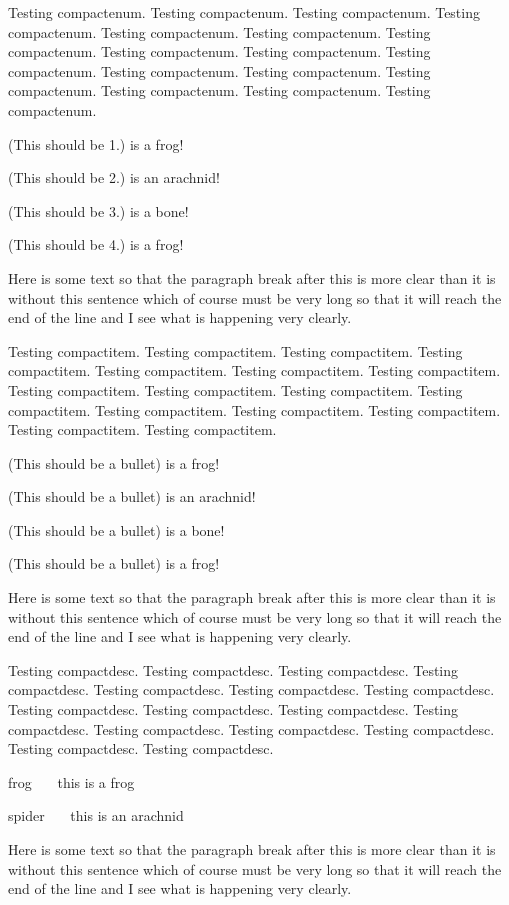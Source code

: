\documentclass{article}
\begin{document}
Testing compactenum. Testing compactenum. Testing compactenum. Testing compactenum.
Testing compactenum. Testing compactenum. Testing compactenum. Testing compactenum.
Testing compactenum. Testing compactenum. Testing compactenum. Testing compactenum.
Testing compactenum. Testing compactenum. Testing compactenum. Testing compactenum.
\begin{compactenum}
\item (This should be 1.) is a frog!
\item (This should be 2.) is an arachnid!
\item (This should be 3.) is a bone!
\item (This should be 4.) is a frog!
\end{compactenum}
Here is some text so that the paragraph break after this
is more clear than it is without this sentence which of
course must be very long so that it will reach the end of
the line and I see what is happening very clearly.

Testing compactitem. Testing compactitem. Testing compactitem. Testing compactitem.
Testing compactitem. Testing compactitem. Testing compactitem. Testing compactitem.
Testing compactitem. Testing compactitem. Testing compactitem. Testing compactitem.
Testing compactitem. Testing compactitem. Testing compactitem. Testing compactitem.
\begin{compactitem}
\item (This should be a bullet) is a frog!
\item (This should be a bullet) is an arachnid!
\item (This should be a bullet) is a bone!
\item (This should be a bullet) is a frog!
\end{compactitem}
Here is some text so that the paragraph break after this
is more clear than it is without this sentence which of
course must be very long so that it will reach the end of
the line and I see what is happening very clearly.

Testing compactdesc. Testing compactdesc. Testing compactdesc. Testing compactdesc.
Testing compactdesc. Testing compactdesc. Testing compactdesc. Testing compactdesc.
Testing compactdesc. Testing compactdesc. Testing compactdesc. Testing compactdesc.
Testing compactdesc. Testing compactdesc. Testing compactdesc. Testing compactdesc.
\begin{compactdesc}
\item[frog~~~] this is a frog
\item[spider~~~] this is an arachnid
\end{compactdesc}
Here is some text so that the paragraph break after this
is more clear than it is without this sentence which of
course must be very long so that it will reach the end of
the line and I see what is happening very clearly.
\end{document}
